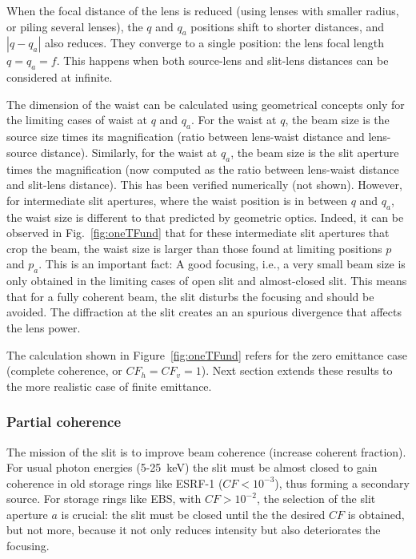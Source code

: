 \documentclass{iucr}              %
\begin{document}
When the focal distance of the lens is reduced (using lenses with smaller radius, or piling several lenses), the $q$ and $q_a$ positions shift to shorter distances, and  $|q-q_a|$ also reduces. They converge to a single position: the lens focal length $q=q_a=f$. This happens when both source-lens and slit-lens distances can be considered at infinite. 

The dimension of the waist can be calculated using geometrical concepts only for the limiting cases of waist at $q$ and $q_a$. For the waist at $q$, the beam size is the source size times its magnification (ratio between lens-waist distance and lens-source distance). Similarly, for the waist at $q_a$, the beam size is the slit aperture times the magnification (now computed as the ratio between lens-waist distance and slit-lens distance). This has been verified numerically (not shown). However, for intermediate slit apertures, where the waist position is in between $q$ and $q_a$, the waist size is different to that predicted by geometric optics.
Indeed, it can be observed in Fig.~\ref{fig:oneTFund} that for these intermediate slit apertures that crop the beam, the waist size is larger than those found at limiting positions $p$ and $p_a$.
This is an important fact: A good focusing, i.e., a very small beam size is only obtained in the limiting cases of open slit and almost-closed slit. This means that for a fully coherent beam, the slit disturbs the focusing and should be avoided. The diffraction at the slit creates an an spurious divergence that affects the lens power. 

The calculation shown in Figure~\ref{fig:oneTFund} refers for the zero emittance case (complete coherence, or $CF_h=CF_v=1$). Next section extends these results to the more realistic case of finite emittance.

\subsubsection{Partial coherence} The mission of the slit is to improve beam coherence (increase coherent fraction). For usual photon energies (5-25~keV)  the slit must be almost closed to gain coherence in old storage rings like ESRF-1 ($CF<10^{-3}$), thus forming a secondary source. For storage rings like EBS, with $CF > 10^{-2}$, the selection of the slit aperture $a$ is crucial: the slit must be closed until the the desired $CF$ is obtained, but not more, because it not only reduces intensity but also deteriorates the focusing. 
\end{document}
